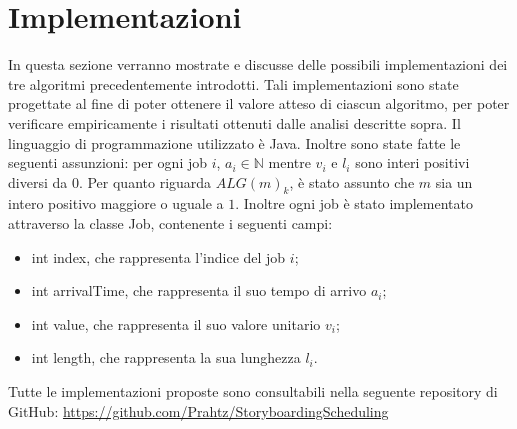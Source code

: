 \documentclass[12pt]{article}
\newcommand*{\N}{\mathbb{N}}
\begin{document}
\section{Implementazioni}
In questa sezione verranno mostrate e discusse delle possibili implementazioni  dei tre algoritmi precedentemente introdotti. Tali implementazioni sono state progettate al fine di poter ottenere il valore atteso di ciascun algoritmo, per poter verificare empiricamente i risultati ottenuti dalle analisi descritte sopra. Il linguaggio di programmazione utilizzato è Java. Inoltre sono state fatte le seguenti assunzioni: per ogni job $i$, $a_{i} \in \N$ mentre $v_{i}$ e $l_{i}$ sono interi positivi diversi da $0$. Per quanto riguarda $ALG(m)_{k}$, è stato assunto che $m$ sia un intero positivo maggiore o uguale a $1$. Inoltre ogni job è stato implementato attraverso la classe Job, contenente i seguenti campi:
\begin{itemize}
\item{int index, che rappresenta l’indice del job $i$;}
\item{int arrivalTime, che rappresenta il suo tempo di arrivo $a_{i}$;}
\item{int value, che rappresenta il suo valore unitario $v_{i}$;}
\item{int length, che rappresenta la sua lunghezza $l_{i}$.}
\end{itemize}
Tutte le implementazioni proposte sono consultabili nella seguente repository di GitHub: \url{https://github.com/Prahtz/StoryboardingScheduling}
\end{document}
